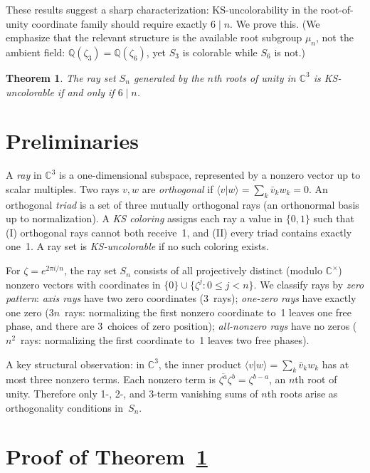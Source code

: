 \documentclass[twocolumn,prl,superscriptaddress,nofootinbib]{revtex4-2}
\newtheorem{theorem}{Theorem}
\newcommand{\C}{\mathbb{C}}
\newcommand{\Q}{\mathbb{Q}}
\begin{document}
These results suggest a sharp characterization: KS-uncolorability in the root-of-unity coordinate family should require exactly $6 \mid n$.  We prove this.  (We emphasize that the relevant structure is the available root subgroup $\mu_n$, not the ambient field: $\Q(\zeta_3) = \Q(\zeta_6)$, yet $S_3$ is colorable while $S_6$ is not.)

\begin{theorem}\label{thm:main}
The ray set $S_n$ generated by the $n$th roots of unity in $\C^3$ is KS-un\-color\-able if and only if $6 \mid n$.
\end{theorem}

\section{Preliminaries}

A \emph{ray} in $\C^3$ is a one-dimensional subspace, represented by a nonzero vector up to scalar multiples.  Two rays $v, w$ are \emph{orthogonal} if $\langle v | w \rangle = \sum_k \bar{v}_k w_k = 0$.  An orthogonal \emph{triad} is a set of three mutually orthogonal rays (an orthonormal basis up to normalization).  A \emph{KS coloring} assigns each ray a value in $\{0,1\}$ such that (I) orthogonal rays cannot both receive~1, and (II) every triad contains exactly one~1.  A ray set is \emph{KS-uncolorable} if no such coloring exists.

For $\zeta = e^{2\pi i/n}$, the ray set $S_n$ consists of all projectively distinct (modulo $\C^\times$) nonzero vectors with coordinates in $\{0\} \cup \{\zeta^j : 0 \leq j < n\}$.  We classify rays by \emph{zero pattern}: \emph{axis rays} have two zero coordinates (3~rays); \emph{one-zero rays} have exactly one zero ($3n$~rays: normalizing the first nonzero coordinate to~1 leaves one free phase, and there are 3~choices of zero position); \emph{all-nonzero rays} have no zeros ($n^2$~rays: normalizing the first coordinate to~1 leaves two free phases).

A key structural observation: in $\C^3$, the inner product $\langle v | w \rangle = \sum_k \bar{v}_k w_k$ has at most three nonzero terms.  Each nonzero term is $\overline{\zeta^a}\zeta^b = \zeta^{b-a}$, an $n$th root of unity.  Therefore only 1-, 2-, and 3-term vanishing sums of $n$th roots arise as orthogonality conditions in~$S_n$.

\section{Proof of Theorem~\ref{thm:main}}
\end{document}
